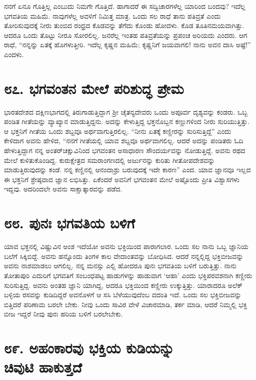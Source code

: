 ನನಗೆ ಏನೂ ಗೊತ್ತಿಲ್ಲ ಎಂಬುದು ನಿಮಗೇ ಗೊತ್ತಿದೆ. ಹಾಗಾದರೆ ಈ ಸದ್ವಿಚಾರಗಳೆಲ್ಲ ಯಾರಿಂದ ಬಂದವು? ಇದೆಲ್ಲ ಭಗವತಿಯ ಮಹಿಮೆ. ನಾವುಗಳೆಲ್ಲ ಅವಳಿಗೆ ನಿಮಿತ್ತ ಮಾತ್ರ. ಒಂದು ಸಲ ರಾಧೆ ತಾನು ಪತಿವ್ರತೆ ಎಂದು ತೋರಿಸುವುದಕ್ಕೆ ನೀರು ತುಂಬಿದ ರಂಧ್ರದ ಕೊಡವನ್ನು ತೆಗೆದು ಕೊಂಡು ಹೋದಳು. ಕೊಡ ತೂತಿನಮಯವಾಗಿತ್ತು. ಆದರೂ ಒಂದು ತೊಟ್ಟು ನೀರೂ ಸೋರಲಿಲ್ಲ. ಜನರೆಲ್ಲ ಇಂತಹ ಪತಿವ್ರತೆಯನ್ನು ಪ್ರಪಂಚ ಅರಿಯದು ಎಂದರು. ಆಗ ರಾಧೆ, “ನನ್ನನ್ನು ಏತಕ್ಕೆ ಹೊಗಳುತ್ತೀರಿ. ಇದೆಲ್ಲ ಕೃಷ್ಣನ ಮಹಿಮೆ; ಕೃಷ್ಣನಿಗೆ ಜಯವಾಗಲಿ! ನಾನು ಅವನ ದಾಸಿ ಅಷ್ಟೆ!” ಎಂದಳು.


\section{\num{೮೭. } ಭಗವಂತನ ಮೇಲೆ ಪರಿಶುದ್ಧ ಪ್ರೇಮ}

ಭಾರತದೇಶದ ದಕ್ಷಿಣಭಾಗದಲ್ಲಿ ತಿರುಗಾಡುತ್ತಿದ್ದಾಗ ಶ್ರೀ ಚೈತನ್ಯದೇವರು ಒಂದು ಅಪೂರ್ವ ದೃಶ್ಯವನ್ನು ಕಂಡರು. ಒಬ್ಬ ಪಂಡಿತ ಗೀತೆಯನ್ನು ವ್ಯಾಖ್ಯಾನ ಮಾಡುತ್ತಿದ್ದನು. ಅದನ್ನು ಕೇಳುತ್ತಿದ್ದ ಭಕ್ತನೊಬ್ಬನ ಕಣ್ಣುಗಳಿಂದ ನೀರು ಸುರಿಯುತ್ತಿತ್ತು. ಆ ಭಕ್ತನಿಗೆ ಗೀತೆಯ ಒಂದು ಶಬ್ದವೂ ಅರ್ಥವಾಗುತ್ತಿರಲಿಲ್ಲ. “ನೀನು ಏತಕ್ಕೆ ಕಣ್ಣೀರನ್ನು ಸುರಿಸುತ್ತಿದ್ದೆ” ಎಂದು ಕೇಳಿದಾಗ ಅವನು ಹೇಳಿದ, “ನನಗೆ ಗೀತೆಯಲ್ಲಿ ಯಾವ ಶಬ್ದವೂ ಅರ್ಥವಾಗಲಿಲ್ಲ. ಆದರೆ ಅದನ್ನು ಪಂಡಿತರು ಓದಿ ಹೇಳುತ್ತಿದ್ದಾಗ ನನ್ನ ಅಂತರ್​ಚಕ್ಷುವಿನಿಂದ ಭಗವಂತನ ಅಸಾಧಾರಣ ಸೌಂದರ್ಯವನ್ನು ನೋಡುತ್ತಿದ್ದೆ. ಅವನು ರಥದ ಮೇಲೆ ಕುಳಿತುಕೊಂಡಿದ್ದ. ಕುರುಕ್ಷೇತ್ರದ ಸಮರಾಂಗಣದಲ್ಲಿ ಅರ್ಜುನನ್ನು ಕುರಿತು ಗೀತೋಪದೇಶವನ್ನು ಮಾಡುತ್ತಿರುವುದನ್ನು ಕಂಡೆ. ನನ್ನ ಕಣ್ಣಿನಲ್ಲಿ ಆನಂದಾಶ್ರು ಬರುವುದಕ್ಕೆ ಇದೇ ಕಾರಣ” ಎಂದ. ಯಾವ ಜ್ಞಾನವೂ ಇಲ್ಲದ ಈ ಭಕ್ತನಿಗೆ ಶ್ರೇಷ್ಠವಾದ ಜ್ಞಾನ ಲಭಿಸಿತ್ತು. ಏಕೆಂದರೆ ಅವನಿಗೆ ಭಗವಂತನ ಮೇಲೆ ಅಷ್ಟೊಂದು ಪ್ರೀತಿ ವಿಶ್ವಾಸಗಳು ಇದ್ದವು. ಅದರಿಂದಲೇ ಅವನು ಸಾಕ್ಷಾತ್ಕಾರವನ್ನು ಪಡೆದ.


\section{\num{೮೮. } ಪುನಃ ಭಗವತಿಯ ಬಳಿಗೆ}

ಯಾವ ಭಕ್ತನಲ್ಲಿ ವಿಷ್ಣುವಿನ ಅಂಶ ಇದೆಯೋ ಅವನು ಭಕ್ತಿಯಿಂದ ಪಾರಾಗಲಾರ. ಒಂದು ಸಲ ನಾನು ಒಬ್ಬ ಜ್ಞಾನಿಯ ಬಲೆಗೆ ಸಿಕ್ಕಿಬಿದ್ದೆ. ಅವನು ಹನ್ನೊಂದು ತಿಂಗಳ ಕಾಲ ವೇದಾಂತವನ್ನು ಬೋಧಿಸಿದ. ಆದರೆ ನನ್ನಲ್ಲಿದ್ದ ಭಕ್ತಿಬೀಜವನ್ನು ಅವನು ನಾಶಮಾಡಲು ಆಗಲಿಲ್ಲ. ನನ್ನ ಮನಸ್ಸು ಎಲ್ಲಿ ಹೋದರೂ ಪುನಃ ಭಗವತಿಯ ಬಳಿಗೆ ಬರುತ್ತಿತ್ತು. ನಾನು ತೋತಾಪುರಿ ಎದುರಿಗೆ ಭಗವತಿಗೆ ಸಂಬಂಧಪಟ್ಟ ಹಾಡುಗಳನ್ನು ಹಾಡುವಾಗ ‘ಆಹಾ’ ಎಂದು ಭಕ್ತಿಪರವಶನಾಗಿ ಕಣ್ಣೀರು ಸುರಿಸುತ್ತಿದ್ದ. ಅವನು ಅಂತಹ ಜ್ಞಾನಿ ಯಾಗಿದ್ದ, ಆದರೂ ಭಕ್ತಿಯಿಂದ ಕಣ್ಣೀರು ಉಕ್ಕುತ್ತಿತ್ತು. ಯಾರಾದರೂ ಅಲೆಕ್ ಬಳ್ಳಿಯ ರಸವನ್ನು ಕುಡಿದಿದ್ದರೆ ಅವನೊಳಗೆ ಆ ಸಸಿ ಬೆಳೆಯುವುದೆಂಬ ವದಂತಿ ಇದೆ. ಒಂದು ಸಲ ಭಕ್ತಿಬೀಜವನ್ನು ಬಿತ್ತಿದರೆ ಪರಿಣಾಮ ಬರಲೇ ಬೇಕು. ನೀವು ಒಂದು ಸಾವಿರ ವೇಳೆ ವಿಚಾರಮಾಡಿ, ತರ್ಕ ಮಾಡಿ, ಆದರೆ ನಿಮ್ಮಲ್ಲಿ ಭಕ್ತಿ ಬೀಜ ಇದ್ದರೆ ನೀವು ಪುನಃ ಹರಿಯ ಬಳಿಗೆ ಬರಲೇಬೇಕು.


\section{\num{೮೯. } ಅಹಂಕಾರವು ಭಕ್ತಿಯ ಕುಡಿಯನ್ನು\\ಚಿವುಟಿ ಹಾಕುತ್ತದೆ}

